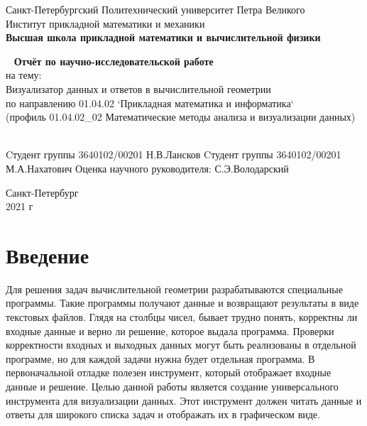 \documentclass[12pt]{article}
\renewcommand{\listoftables}{\begingroup  %
\tocsection
\tocfile{\listtablename}{lot}
\endgroup}
\begin{document}
\begin{titlepage}
	\center
		Санкт-Петербургский Политехнический университет Петра Великого\\
		Институт прикладной математики и механики
		\\ \textbf{Высшая школа прикладной математики и вычислительной физики}

	\vfill ~
	\textbf{ \large Отчёт по научно-исследовательской работе } \\
    \large на тему: \\
	\large Визуализатор данных и ответов в вычислительной геометрии \\
	\large по направлению 01.04.02 `Прикладная математика и информатика` \\
	\large (профиль 01.04.02\_02 Математические методы анализа и визуализации данных) \\
	\vfill ~
	
    \begin{flushright}
    Cтудент группы 3640102/00201 \underline{\hspace{3cm}} Н.В.Лансков \linebreak[2]
    Cтудент группы 3640102/00201 \underline{\hspace{3cm}} М.А.Нахатович \linebreak[2]
	Оценка научного руководителя: \underline{\hspace{1cm}}\hspace{0.1cm} \underline{\hspace{3cm}} С.Э.Володарский\\  
    \end{flushright}

    
    
\vfill

{\large}Санкт-Петербург
\\ 2021 г
\end{titlepage}


\tableofcontents
\pagebreak

\section{Введение}

Для решения задач вычислительной геометрии разрабатываются специальные программы. Такие программы получают данные и возвращают результаты в виде текстовых файлов. Глядя на столбцы чисел, бывает трудно понять, корректны ли входные данные и верно ли решение, которое выдала программа.
Проверки корректности входных и выходных данных могут быть реализованы в отдельной программе, 
но для каждой задачи нужна будет отдельная программа. В первоначальной отладке полезен инструмент, который отображает входные данные и решение. Целью данной работы является создание универсального инструмента для визуализации данных. Этот инструмент должен читать данные и ответы для широкого списка задач и отображать их в графическом виде.
\end{document}

